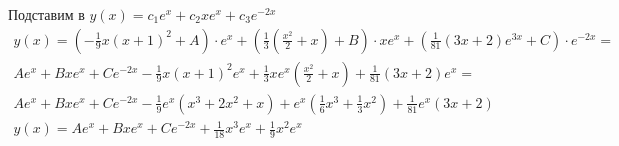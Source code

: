 	Подставим в $y(x) = c_1 e^{x} + c_2 xe^{x} + c_3 e^{-2x}$
	\begin{gather*}
	y(x) = \left(-\frac{1}{9}x(x+1)^2 + A\right) \cdot e^x + \left(\frac{1}{3} \left(\frac{x^2}{2} + x\right) + B\right) \cdot xe^x + \left( \frac{1}{81}(3x+2)e^{3x} + C\right) \cdot e^{-2x} =
	\\
	A e^{x} + B x e^{x} + C e^{-2x} - \frac{1}{9} x(x+1)^2 e^x + \frac{1}{3} xe^x \left(\frac{x^2}{2} + x\right) + \frac{1}{81}(3x+2)e^x =
	\\
	A e^{x} + B x e^{x} + C e^{-2x} - \frac{1}{9}e^x (x^3 + 2x^2 + x) + e^x(\frac{1}{6}x^3 + \frac{1}{3}x^2) + \frac{1}{81}e^x(3x+2)\\
	y(x) = A e^{x} + B x e^{x} + C e^{-2x} + \frac{1}{18}x^3 e^x + \frac{1}{9} x^2 e^x
	\end{gather*}
\vskip 0.4in


